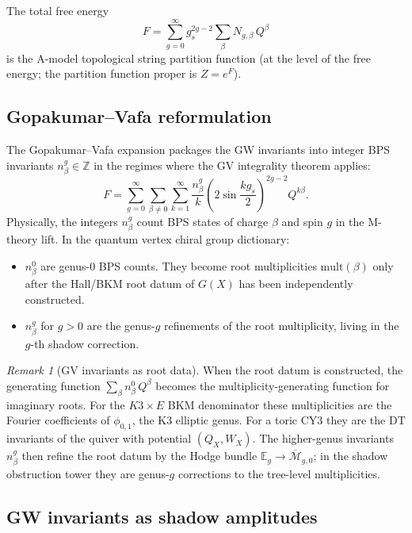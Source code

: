 \documentclass[11pt]{amsart}
\theoremstyle{plain}
\theoremstyle{definition}
\theoremstyle{remark}
\newtheorem{remark}[theorem]{Remark}
\newcommand{\Mbar}{\overline{\mathcal{M}}}
\begin{document}
The total free energy
\[
 F = \sum_{g=0}^{\infty} g_s^{2g-2} \sum_{\beta} N_{g,\beta}\, Q^\beta
\]
is the A-model topological string partition function (at the level of the
free energy; the partition function proper is $Z = e^F$).

\subsection{Gopakumar--Vafa reformulation}
\label{sub:gv}

The Gopakumar--Vafa expansion packages the GW invariants into integer BPS
invariants $n^g_\beta \in \mathbb{Z}$ in the regimes where the GV
integrality theorem applies:
\begin{equation}\label{eq:gv}
 F = \sum_{g=0}^{\infty} \sum_{\beta \neq 0} \sum_{k=1}^{\infty}
 \frac{n^g_\beta}{k}
 \left(2\sin\frac{k g_s}{2}\right)^{2g-2} Q^{k\beta}.
\end{equation}
Physically, the integers $n^g_\beta$ count BPS states of charge $\beta$
and spin $g$ in the M-theory lift. In the quantum vertex chiral group
dictionary:
\begin{itemize}
 \item $n^0_\beta$ are genus-0 BPS counts. They become root
 multiplicities $\mathrm{mult}(\beta)$ only after the Hall/BKM root datum
 of $G(X)$ has been independently constructed.
 \item $n^g_\beta$ for $g > 0$ are the genus-$g$ refinements of the root
 multiplicity, living in the $g$-th shadow correction.
\end{itemize}

\begin{remark}[GV invariants as root data]
\label{rem:gv-root}
When the root datum is constructed, the generating function
$\sum_\beta n^0_\beta\, Q^\beta$ becomes the multiplicity-generating
function for imaginary roots. For the $K3 \times E$ BKM denominator these
multiplicities are the Fourier coefficients of $\phi_{0,1}$, the K3
elliptic genus. For a toric CY3 they are the DT invariants of the quiver
with potential $(Q_X, W_X)$. The higher-genus invariants $n^g_\beta$ then
refine the root datum by the Hodge bundle
$\mathbb{E}_g \to \Mbar_{g,0}$; in the shadow obstruction tower they are
genus-$g$ corrections to the tree-level multiplicities.
\end{remark}

\subsection{GW invariants as shadow amplitudes}
\label{sub:gw-shadow}
\end{document}
